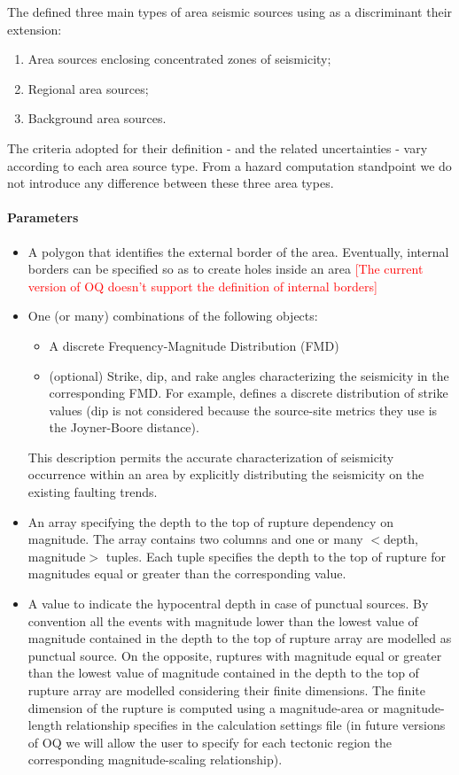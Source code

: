 The \citet{sshac1997} defined three main types of area seismic sources using as 
a discriminant their extension:
\begin{enumerate}
\item Area sources enclosing concentrated zones of seismicity;
\item Regional area sources;
\item Background area sources.
\end{enumerate}
The criteria adopted for their definition - and the related uncertainties - vary according to each area source type. From a hazard computation standpoint we do not introduce any difference between these three area types.
%
\paragraph{Parameters}
\begin{itemize}
\item A polygon that identifies the external border of the area. Eventually, 
internal borders can be specified so as to create holes inside an area
	\textcolor{red}{[The current version of OQ doesn't support the definition of internal borders]}
\item One (or many) combinations of the following objects:
\begin{itemize}
	\item A discrete Frequency-Magnitude Distribution (FMD)
	\item (optional) Strike, dip, and rake angles characterizing the seismicity  in the corresponding FMD.
	For example, \cite{coppersmith2009} defines a discrete distribution of strike values (dip is not considered because the source-site metrics they use is the Joyner-Boore distance). 
\end{itemize}
This description permits the accurate characterization of seismicity occurrence within an area by explicitly distributing the seismicity on the existing faulting trends. 
\item An array specifying the depth to the top of rupture dependency on magnitude. The array contains two columns and one or many $<$depth, magnitude$>$ tuples. Each tuple specifies the depth to the top of rupture for magnitudes equal or greater than the corresponding value. 
\item A value to indicate the hypocentral depth in case of punctual sources. 
By convention all the events with magnitude lower than the lowest value of magnitude contained in the depth to the top of rupture array are modelled as punctual source. On the opposite, ruptures with magnitude equal or greater than the lowest value of magnitude contained in the depth to the top of rupture array are modelled considering their finite dimensions. The finite dimension of the rupture is computed using a magnitude-area or magnitude-length relationship specifies in the calculation settings file (in future versions of OQ we will allow the user to specify for each tectonic region the corresponding magnitude-scaling relationship).
\end{itemize}

